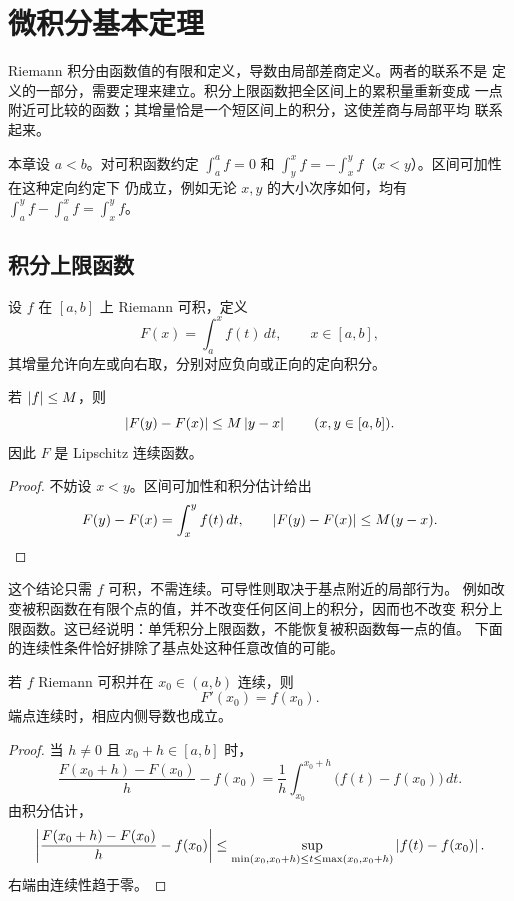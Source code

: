 \chapter{微积分基本定理}
\label{chap:fundamental-theorem-calculus}

Riemann 积分由函数值的有限和定义，导数由局部差商定义。两者的联系不是
定义的一部分，需要定理来建立。积分上限函数把全区间上的累积量重新变成
一点附近可比较的函数；其增量恰是一个短区间上的积分，这使差商与局部平均
联系起来。

本章设 \(a<b\)。对可积函数约定 \(\int_a^a f=0\) 和
\(\int_y^x f=-\int_x^y f\)（\(x<y\)）。区间可加性在这种定向约定下
仍成立，例如无论 \(x,y\) 的大小次序如何，均有
\(\int_a^y f-\int_a^x f=\int_x^y f\)。

\section{积分上限函数}

设 \(f\) 在 \([a,b]\) 上 Riemann 可积，定义
\[
 F(x)=\int_a^x f(t)\,dt,\qquad x\in[a,b],
\]
其增量允许向左或向右取，分别对应负向或正向的定向积分。

\begin{theorem}[积分上限函数的连续性]
\label{thm:indefinite-integral-lipschitz}
若 \(\left|f\right|\le M\)，则
\[
 \left|F(y)-F(x)\right|\le M\left|y-x\right|
 \qquad(x,y\in[a,b]).
\]
因此 \(F\) 是 Lipschitz 连续函数。
\end{theorem}

\begin{proof}
不妨设 \(x<y\)。区间可加性和积分估计给出
\[
 F(y)-F(x)=\int_x^y f(t)\,dt,
\qquad
 \left|F(y)-F(x)\right|\le M(y-x).
\]
\end{proof}

这个结论只需 \(f\) 可积，不需连续。可导性则取决于基点附近的局部行为。
例如改变被积函数在有限个点的值，并不改变任何区间上的积分，因而也不改变
积分上限函数。这已经说明：单凭积分上限函数，不能恢复被积函数每一点的值。
下面的连续性条件恰好排除了基点处这种任意改值的可能。

\begin{theorem}[连续点处的求导]
\label{thm:indefinite-integral-derivative-continuity-point}
若 \(f\) Riemann 可积并在 \(x_0\in(a,b)\) 连续，则
\[
 F'(x_0)=f(x_0).
\]
端点连续时，相应内侧导数也成立。
\end{theorem}

\begin{proof}
当 \(h\ne0\) 且 \(x_0+h\in[a,b]\) 时，
\[
 \frac{F(x_0+h)-F(x_0)}h-f(x_0)
 =\frac1h\int_{x_0}^{x_0+h}\bigl(f(t)-f(x_0)\bigr)\,dt.
\]
由积分估计，
\[
 \left|\frac{F(x_0+h)-F(x_0)}h-f(x_0)\right|
 \le
 \sup_{\min(x_0,x_0+h)\le t\le\max(x_0,x_0+h)}
 \left|f(t)-f(x_0)\right|.
\]
右端由连续性趋于零。
\end{proof}

